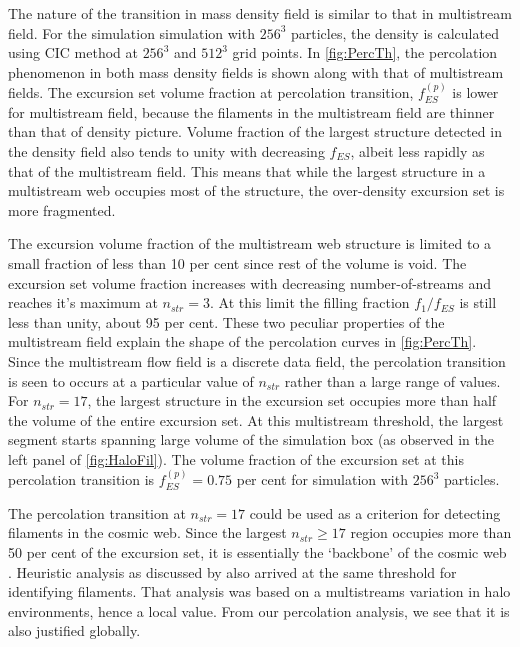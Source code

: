 The nature of the transition in mass density field is similar to that in multistream field. For the simulation simulation with $256^3$ particles, the density is calculated using CIC method at $256^3$ and $512^3$ grid points. In \autoref{fig:PercTh}, the percolation phenomenon in both mass density fields is shown along with that of multistream fields. The excursion set volume fraction at percolation transition, $f_{ES}^{(p)}$ is lower for multistream field, because the filaments in the multistream field are thinner than that of density picture. Volume fraction of the largest structure detected in the density field also tends to unity with decreasing $f_{ES}$, albeit less rapidly as that of the multistream field. This means that while the largest structure in a multistream web occupies most of the structure, the over-density excursion set is more fragmented.
  







The excursion volume fraction of the multistream web structure is limited to a small fraction of  less than 10 per cent since rest of the volume is void. The excursion set volume fraction increases with decreasing number-of-streams and reaches it's maximum at $n_{str} = 3$.  At this limit the filling fraction $f_1/f_{ES}$ is still less than unity, about 95 per cent. These two peculiar properties of the multistream field explain the shape of the percolation curves in \autoref{fig:PercTh}.
Since the multistream flow field is a discrete data field, the percolation transition is seen to occurs at a particular value of $n_{str}$ rather than a large range of values. For $n_{str} = 17$, the largest structure in the excursion set occupies more than half the volume of the entire excursion set. At this multistream threshold, the largest segment starts spanning large volume of the simulation box (as observed in the left panel of \autoref{fig:HaloFil}). The volume fraction of the excursion set at this percolation transition is $f_{ES}^{(p)} = 0.75$ per cent for simulation with $256^3$ particles. 

The percolation transition at $n_{str} = 17$ could be used as a criterion for detecting filaments in the cosmic web. Since the largest $n_{str} \geq 17$ region occupies more than 50 per cent of the excursion set, it is essentially the `backbone' of the cosmic web \citep{Shandarin2010b}. Heuristic analysis as discussed by \cite{Ramachandra2015} also arrived at the same threshold for identifying filaments. That analysis was based on a multistreams variation in halo environments, hence a local value. From our percolation analysis, we see that it is also justified globally. 



